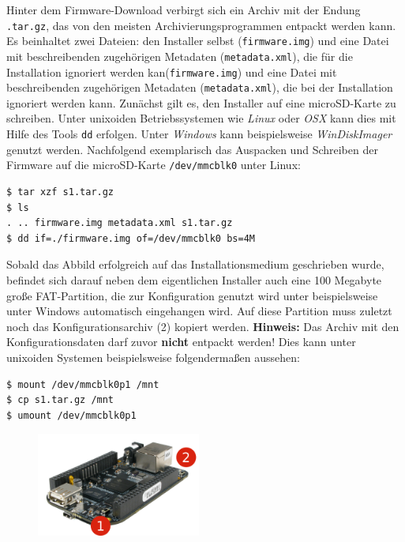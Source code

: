 \documentclass[12pt]{article}
\begin{document}
Hinter dem Firmware-Download verbirgt sich ein Archiv mit der Endung \verb|.tar.gz|, das von den meisten Archivierungsprogrammen entpackt werden kann. Es beinhaltet zwei Dateien: den Installer selbst (\verb|firmware.img|) und eine Datei mit beschreibenden zugehörigen Metadaten (\verb|metadata.xml|), die für die Installation ignoriert werden kan(\verb|firmware.img|) und eine Datei mit beschreibenden zugehörigen Metadaten (\verb|metadata.xml|), die bei der Installation ignoriert werden kann. Zunächst gilt es, den Installer auf eine microSD-Karte zu schreiben. Unter unixoiden Betriebssystemen wie \textit{Linux} oder \textit{OSX} kann dies mit Hilfe des Tools \verb|dd| erfolgen. Unter \textit{Windows} kann beispielsweise \textit{WinDiskImager} genutzt werden. Nachfolgend exemplarisch das Auspacken und Schreiben der Firmware auf die microSD-Karte \verb|/dev/mmcblk0| unter Linux:
\begin{lstlisting}
$ tar xzf s1.tar.gz
$ ls
. .. firmware.img metadata.xml s1.tar.gz
$ dd if=./firmware.img of=/dev/mmcblk0 bs=4M
\end{lstlisting}
Sobald das Abbild erfolgreich auf das Installationsmedium geschrieben wurde, befindet sich darauf neben dem eigentlichen Installer auch eine 100 Megabyte große FAT-Partition, die zur Konfiguration genutzt wird unter beispielsweise unter Windows automatisch eingehangen wird. Auf diese Partition muss zuletzt noch das Konfigurationsarchiv (2) kopiert werden. \textbf{Hinweis:} Das Archiv mit den Konfigurationsdaten darf zuvor \textbf{nicht} entpackt werden! Dies kann unter unixoiden Systemen beispielsweise folgendermaßen aussehen:
\begin{lstlisting}
$ mount /dev/mmcblk0p1 /mnt
$ cp s1.tar.gz /mnt
$ umount /dev/mmcblk0p1
\end{lstlisting}
\begin{figure}
				\vspace{-15pt}
				\centering
				\includegraphics[width=0.48\textwidth]{./graphics/howto-sensor-add-4.png}
				\vspace{-5pt}
				\label{fig:howto-sensor-add-4}
\end{figure}
\end{document}
